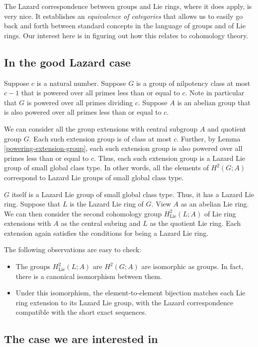 The Lazard correspondence between groups and Lie rings, where it does
apply, is very nice. It establishes an {\em equivalence of categories}
that allows us to easily go back and forth between standard concepts
in the language of groups and of Lie rings. Our interest here is in
figuring out how this relates to cohomology theory.

\subsection{In the good Lazard case}

Suppose $c$ is a natural number. Suppose $G$ is a group of nilpotency
class at most $c - 1$ that is powered over all primes less than or
equal to $c$. Note in particular that $G$ is powered over all primes
dividing $c$. Suppose $A$ is an abelian group that is also powered
over all primes less than or equal to $c$.

We can consider all the group extensions with central subgroup $A$ and
quotient group $G$. Each such extension group is of class at most
$c$. Further, by Lemma \ref{powering-extension-group}, each such
extension group is also powered over all primes less than or equal to
$c$. Thus, each such extension group is a Lazard Lie group of small
global class type. In other words, all the elements of $H^2(G;A)$
correspond to Lazard Lie groups of small global class type.

$G$ itself is a Lazard Lie group of small global class type. Thus, it
has a Lazard Lie ring. Suppose that $L$ is the Lazard Lie ring of
$G$. View $A$ as an abelian Lie ring. We can then consider the second
cohomology group $H^2_{\text{Lie}}(L;A)$ of Lie ring extensions with
$A$ as the central subring and $L$ as the quotient Lie ring. Each
extension again satisfies the conditions for being a Lazard Lie ring.

The following observations are easy to check:

\begin{itemize}
\item The groups $H^2_{\text{Lie}}(L;A)$ are $H^2(G;A)$ are isomorphic
  as groups. In fact, there is a canonical isomorphism between them.
\item Under this isomorphism, the element-to-element bijection matches
  each Lie ring extension to its Lazard Lie group, with the Lazard
  correspondence compatible with the short exact sequences.
\end{itemize}

\subsection{The case we are interested in}

